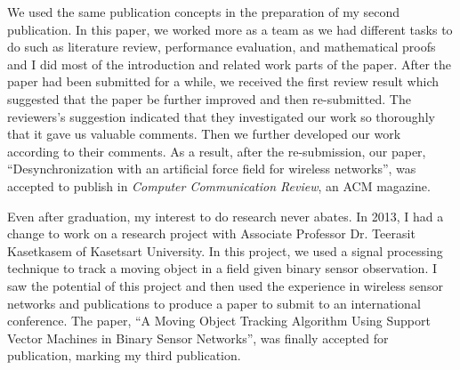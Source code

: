 \documentclass[a4paper]{report}
\begin{document}
\vspace{0.2cm}
We used the same publication concepts in the preparation of my second publication. In this paper, we worked more as a team as we had different tasks to do such as literature review, performance evaluation, and mathematical proofs and I did most of the introduction and related work parts of the paper. After the paper had been submitted for a while, we received the first review result which suggested that the paper be further improved and then re-submitted. The reviewers's suggestion indicated that they investigated our work so thoroughly that it gave us valuable comments. Then we further developed our work according to their comments. As a result, after the re-submission, our paper, ``Desynchronization with an artificial force field for wireless networks'', was accepted to publish in \textit{Computer Communication Review}, an ACM magazine.

\vspace{0.2cm}
Even after graduation, my interest to do research never abates. In 2013, I had a change to work on a research project with Associate Professor Dr. Teerasit Kasetkasem of Kasetsart University. In this project, we used a signal processing technique to track a moving object in a field given binary sensor observation. I saw the potential of this project and then used the experience in wireless sensor networks and publications to produce a paper to submit to an international conference. The paper, ``A Moving Object Tracking Algorithm Using Support Vector Machines in Binary Sensor Networks'', was finally accepted for publication, marking my third publication. 
\end{document}
